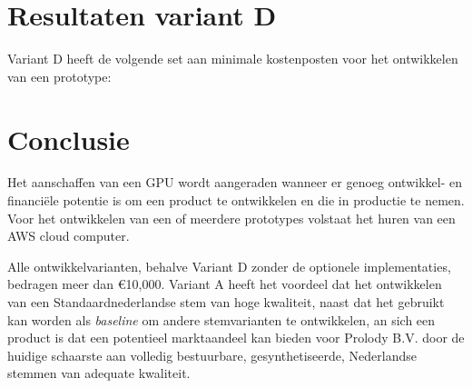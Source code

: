 \section{Resultaten variant D}

Variant D heeft de volgende set aan minimale kostenposten voor het ontwikkelen van een prototype:

\begin{table}[H]
    \centering
    \caption{Resultaten variant D}
    \label{tab:resultaat_variant_d}
\end{table}


\section{Conclusie}
Het aanschaffen van een GPU wordt aangeraden wanneer er genoeg ontwikkel- en financiële potentie is om een product te ontwikkelen en die in productie te nemen. Voor het ontwikkelen van een of meerdere prototypes volstaat het huren van een AWS cloud computer.

Alle ontwikkelvarianten, behalve Variant D zonder de optionele implementaties, bedragen meer dan €10,000. Variant A heeft het voordeel dat het ontwikkelen van een Standaardnederlandse stem van hoge kwaliteit, naast dat het gebruikt kan worden als \textit{baseline} om andere stemvarianten te ontwikkelen, an sich een product is dat een potentieel marktaandeel kan bieden voor Prolody B.V. door de huidige schaarste aan volledig bestuurbare, gesynthetiseerde, Nederlandse stemmen van adequate kwaliteit.